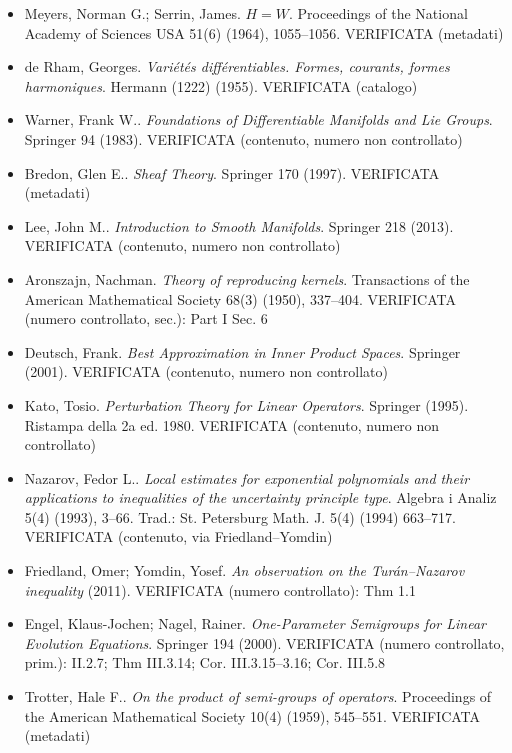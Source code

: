 \documentclass[11pt]{article}
\theoremstyle{plain}
\theoremstyle{definition}
\theoremstyle{remark}
\begin{document}
\begin{itemize}[itemsep=2pt,leftmargin=1.2em,font=\small]
\item Meyers, Norman G.; Serrin, James. \emph{{$H=W$}}. Proceedings of the National Academy of Sciences USA 51(6) (1964), 1055--1056. \textsf{\footnotesize VERIFICATA (metadati)}
\item de Rham, Georges. \emph{Vari{\'e}t{\'e}s diff{\'e}rentiables. Formes, courants, formes harmoniques}. Hermann (1222) (1955). \textsf{\footnotesize VERIFICATA (catalogo)}
\item Warner, Frank W.. \emph{Foundations of Differentiable Manifolds and Lie Groups}. Springer 94 (1983). \textsf{\footnotesize VERIFICATA (contenuto, numero non controllato)}
\item Bredon, Glen E.. \emph{Sheaf Theory}. Springer 170 (1997). \textsf{\footnotesize VERIFICATA (metadati)}
\item Lee, John M.. \emph{Introduction to Smooth Manifolds}. Springer 218 (2013). \textsf{\footnotesize VERIFICATA (contenuto, numero non controllato)}
\item Aronszajn, Nachman. \emph{Theory of reproducing kernels}. Transactions of the American Mathematical Society 68(3) (1950), 337--404. \textsf{\footnotesize VERIFICATA (numero controllato, sec.): Part I Sec. 6}
\item Deutsch, Frank. \emph{Best Approximation in Inner Product Spaces}. Springer (2001). \textsf{\footnotesize VERIFICATA (contenuto, numero non controllato)}
\item Kato, Tosio. \emph{Perturbation Theory for Linear Operators}. Springer (1995). \textsf{\footnotesize Ristampa della 2a ed. 1980. VERIFICATA (contenuto, numero non controllato)}
\item Nazarov, Fedor L.. \emph{Local estimates for exponential polynomials and their applications to inequalities of the uncertainty principle type}. Algebra i Analiz 5(4) (1993), 3--66. \textsf{\footnotesize Trad.: St. Petersburg Math. J. 5(4) (1994) 663--717. VERIFICATA (contenuto, via Friedland--Yomdin)}
\item Friedland, Omer; Yomdin, Yosef. \emph{An observation on the {T}ur{\'a}n--{N}azarov inequality} (2011). \textsf{\footnotesize VERIFICATA (numero controllato): Thm 1.1}
\item Engel, Klaus-Jochen; Nagel, Rainer. \emph{One-Parameter Semigroups for Linear Evolution Equations}. Springer 194 (2000). \textsf{\footnotesize VERIFICATA (numero controllato, prim.): II.2.7; Thm III.3.14; Cor. III.3.15--3.16; Cor. III.5.8}
\item Trotter, Hale F.. \emph{On the product of semi-groups of operators}. Proceedings of the American Mathematical Society 10(4) (1959), 545--551. \textsf{\footnotesize VERIFICATA (metadati)}

\end{itemize}
\end{document}

